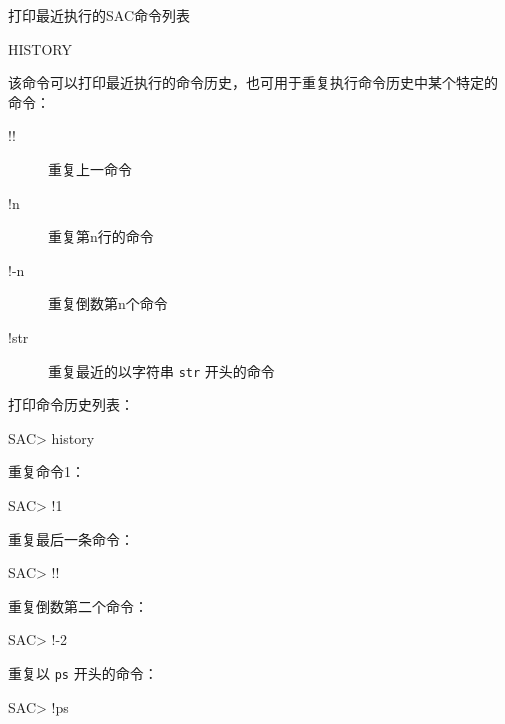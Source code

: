 \label{cmd:history}

打印最近执行的SAC命令列表

\begin{SACSTX}
HISTORY
\end{SACSTX}

该命令可以打印最近执行的命令历史，也可用于重复执行命令历史中某个特定的
命令：
\begin{description}
\item [!!] 重复上一命令
\item [!n] 重复第n行的命令
\item [!-n] 重复倒数第n个命令
\item [!str] 重复最近的以字符串 \texttt{str} 开头的命令
\end{description}

打印命令历史列表：
\begin{SACCode}
SAC> history
\end{SACCode}

重复命令1：
\begin{SACCode}
SAC> !1
\end{SACCode}

重复最后一条命令：
\begin{SACCode}
SAC> !!
\end{SACCode}

重复倒数第二个命令：
\begin{SACCode}
SAC> !-2
\end{SACCode}

重复以 \texttt{ps} 开头的命令：
\begin{SACCode}
SAC> !ps
\end{SACCode}
